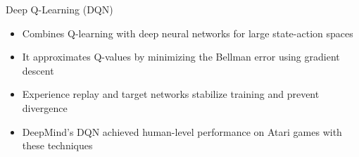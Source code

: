 \documentclass[11pt,table]{beamer}
\begin{document}
\begin{frame}{Deep Q-Learning (DQN)}
\begin{itemize}
   \item Combines Q-learning with deep neural networks for large state-action spaces
    \item It approximates Q-values by minimizing the Bellman error using gradient descent
    \item Experience replay and target networks stabilize training and prevent divergence
    \item DeepMind's DQN achieved human-level performance on Atari games with these techniques
\end{itemize}
\end{frame}
\end{document}
